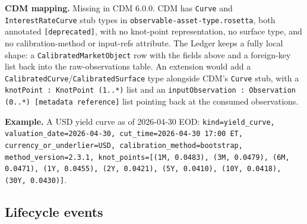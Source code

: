 \documentclass[11pt,a4paper]{article}
\begin{document}
\textbf{CDM mapping.} Missing in CDM 6.0.0. CDM has \texttt{Curve} and \texttt{InterestRateCurve} stub types in \texttt{observable-asset-type.rosetta}, both annotated \texttt{[deprecated]}, with no knot-point representation, no surface type, and no calibration-method or input-refs attribute. The Ledger keeps a fully local shape: a \texttt{CalibratedMarketObject} row with the fields above and a foreign-key list back into the raw-observations table. An extension would add a \texttt{CalibratedCurve}/\texttt{CalibratedSurface} type alongside CDM's \texttt{Curve} stub, with a \texttt{knotPoint : KnotPoint (1..*)} list and an \texttt{inputObservation : Observation (0..*) [metadata reference]} list pointing back at the consumed observations.

\textbf{Example.} A USD yield curve as of 2026-04-30 EOD: \texttt{kind=yield\_curve, valuation\_date=2026-04-30, cut\_time=2026-04-30 17:00 ET, currency\_or\_underlier=USD, calibration\_method=bootstrap, method\_version=2.3.1, knot\_points=[(1M, 0.0483), (3M, 0.0479), (6M, 0.0471), (1Y, 0.0455), (2Y, 0.0421), (5Y, 0.0410), (10Y, 0.0418), (30Y, 0.0430)]}.

\subsection{Lifecycle events}
\end{document}
